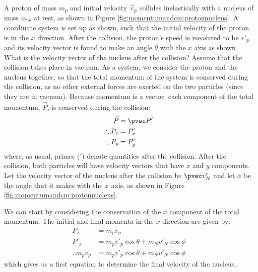 \begin{example}{
A proton of mass $m_p$ and initial velocity $\vec v_p$ collides inelastically with a nucleus of mass $m_N$ at rest, as shown in Figure \ref{fig:momentumandcm:protonnucleus}. A coordinate system is set up as shown, such that the initial velocity of the proton is in the $x$ direction. After the collision, the proton's speed is measured to be $v'_p$ and its velocity vector is found to make an angle $\theta$ with the $x$ axis as shown. What is the velocity vector of the nucleus after the collision? Assume that the collision takes place in vacuum.}
As a system, we consider the proton and the nucleus together, so that the total momentum of the system is conserved during the collision, as no other external forces are exerted on the two particles (since they are in vacuum). Because momentum is a vector, each component of the total momentum, $\vec P$, is conserved during the collision:
\begin{align*}
\vec P &= \pvec P'\\
\therefore P_x &= P'_x\\
\therefore P_y &= P'_y
\end{align*}
where, as usual, primes ($'$) denote quantities after the collision. After the collision, both particles will have velocity vectors that have $x$ and $y$ components. Let the velocity vector of the nucleus after the collision be $\pvec v'_N$ and let $\phi$ be the angle that it makes with the $x$ axis, as shown in Figure \ref{fig:momentumandcm:protonnucleus}. 

We can start by considering the conservation of the $x$ component of the total momentum. The initial and final momenta in the $x$ direction are given by:
\begin{align*}
P_x &= m_p v_p\\
P'_x &= m_p v'_p\cos\theta + m_N v'_N\cos\phi\\
\therefore m_p v_p &= m_p v'_p\cos\theta + m_N v'_N\cos\phi
\end{align*}
which gives us a first equation to determine the final velocity of the nucleus.


\end{example}
